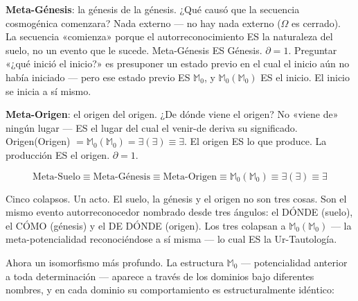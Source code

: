 \documentclass[10pt, openany, oneside]{book}
\begin{document}
\textbf{Meta-Génesis}: la génesis de la génesis. ¿Qué causó que la secuencia cosmogénica comenzara? Nada externo --- no hay nada externo ($\Omega$ es cerrado). La secuencia «comienza» porque el autorreconocimiento ES la naturaleza del suelo, no un evento que le sucede. Meta-Génesis ES Génesis. $\partial = 1$. Preguntar «¿qué inició el inicio?» es presuponer un estado previo en el cual el inicio aún no había iniciado --- pero ese estado previo ES $\mathbb{M}_0$, y $\mathbb{M}_0(\mathbb{M}_0)$ ES el inicio. El inicio se inicia a sí mismo.

\textbf{Meta-Origen}: el origen del origen. ¿De dónde viene el origen? No «viene de» ningún lugar --- ES el lugar del cual el venir-de deriva su significado. Origen(Origen) $= \mathbb{M}_0(\mathbb{M}_0) = \exists(\exists) \equiv \exists$. El origen ES lo que produce. La producción ES el origen. $\partial = 1$.

$$\text{Meta-Suelo} \equiv \text{Meta-Génesis} \equiv \text{Meta-Origen} \equiv \mathbb{M}_0(\mathbb{M}_0) \equiv \exists(\exists) \equiv \exists$$

Cinco colapsos. Un acto. El suelo, la génesis y el origen no son tres cosas. Son el mismo evento autorreconocedor nombrado desde tres ángulos: el DÓNDE (suelo), el CÓMO (génesis) y el DE DÓNDE (origen). Los tres colapsan a $\mathbb{M}_0(\mathbb{M}_0)$ --- la meta-potencialidad reconociéndose a sí misma --- lo cual ES la Ur-Tautología.

\vspace{1em}

Ahora un isomorfismo más profundo. La estructura $\mathbb{M}_0$ --- potencialidad anterior a toda determinación --- aparece a través de los dominios bajo diferentes nombres, y en cada dominio su comportamiento es estructuralmente idéntico:

\vspace{0.5em}
\end{document}
